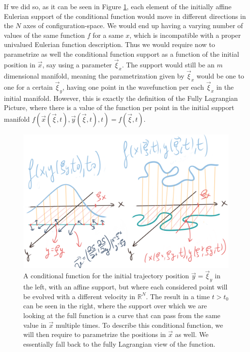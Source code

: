 \documentclass[11pt, a4paper]{article} %
\newcommand{\R}{\mathbb{R}} %
\begin{document}
{If we did so, as it can be seen in Figure \ref{fig:fallback}, each element of the initially affine Eulerian support of the conditional function would move in different directions in the $N$ axes of configuration-space. We would end up having a varying number of values of the same function $f$ for a same $x$, which is incompatible with a proper univalued Eulerian function description. Thus we would require now to parametrize as well the conditional function support as a function of the initial position in $\vec{x}$, say using a parameter $\vec{\xi}_x$. The support would still be an $m$ dimensional manifold, meaning the parametrization given by $\vec{\xi}_x$ would be one to one for a certain $\vec{\xi}_y$, having one point in the wavefunction per each $\vec{\xi}_x$ in the initial manifold. However, this is exactly the definition of the Fully Lagrangian Picture, where there is a value of the function per point in the initial support manifold $f(\vec{x}(\vec{\xi},t), \vec{y}(\vec{\xi},t),t)=f(\vec{\xi},t)$.
}


\begin{figure}[h!]
  \centering
    \includegraphics[width=0.65\linewidth]{unstructuring.png}
  \caption{A conditional function for the initial trajectory position $\vec{y}=\vec{\xi}_y$ in the left, with an affine support, but where each considered point will be evolved with a different velocity in $\R^N$. The result in a time $t>t_0$ can be seen in the right, where the support over which we are looking at the full function is a curve that can pass from the same value in $\vec{x}$ multiple times. To describe this conditional function, we will then require to parametrize the positions in $\vec{x}$ as well. We essentially fall back to the fully Lagrangian view of the function. }
  \label{fig:fallback}
\end{figure}
\end{document}

